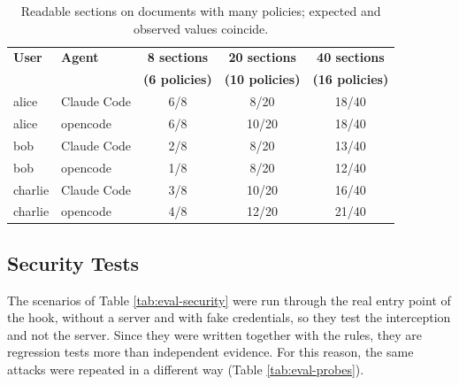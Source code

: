 \begin{table}[H]
  \centering
  \begingroup\linespread{1.0}\small
  \begin{tabular}{@{}llccc@{}}
    \toprule
    \textbf{User} & \textbf{Agent} & \textbf{8 sections} & \textbf{20 sections} & \textbf{40 sections} \\
     & & \textbf{(6 policies)} & \textbf{(10 policies)} & \textbf{(16 policies)} \\
    \midrule
    alice   & Claude Code & 6/8 & 8/20  & 18/40 \\
    alice   & opencode    & 6/8 & 10/20 & 18/40 \\
    bob     & Claude Code & 2/8 & 8/20  & 13/40 \\
    bob     & opencode    & 1/8 & 8/20  & 12/40 \\
    charlie & Claude Code & 3/8 & 10/20 & 16/40 \\
    charlie & opencode    & 4/8 & 12/20 & 21/40 \\
    \bottomrule
  \end{tabular}
  \endgroup
  \caption{Readable sections on documents with many policies; expected and observed values coincide.}\label{tab:eval-policies}
\end{table}

\subsection{Security Tests}
The scenarios of Table \ref{tab:eval-security} were run through the real entry point of the hook, without a server and with fake credentials, so they test the interception and not the server.
Since they were written together with the rules, they are regression tests more than independent evidence. For this reason, the same attacks were repeated in a different way (Table \ref{tab:eval-probes}).

